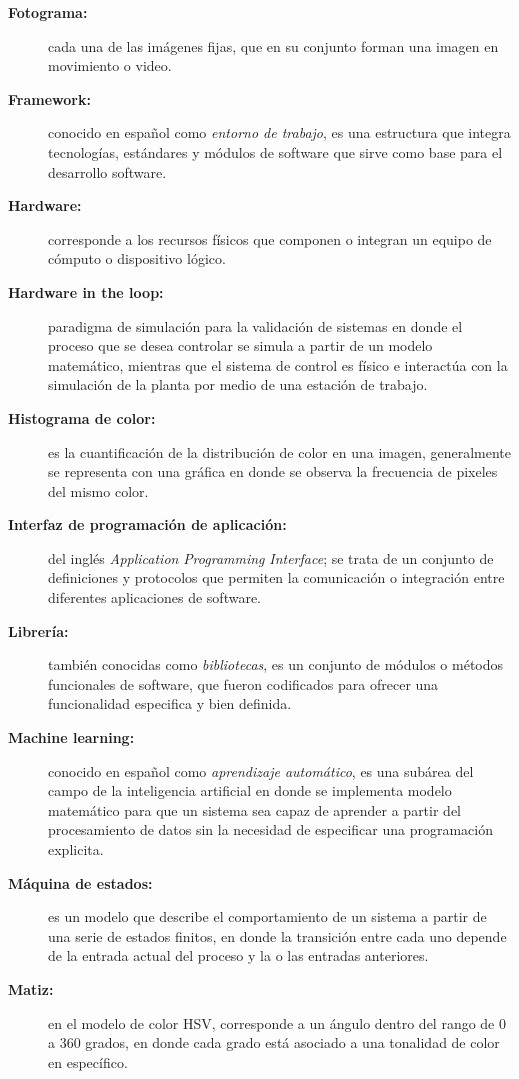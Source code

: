 \begin{description}
  \item[\textbf{Fotograma:}] cada una de las imágenes fijas, que en su conjunto forman una imagen en movimiento o video.
  \item[\textbf{Framework:}] conocido en español como \textit{entorno de trabajo}, es una estructura que integra tecnologías, estándares y módulos de software que sirve como base para el desarrollo software.
  \item[\textbf{Hardware:}] corresponde a los recursos físicos que componen o integran un equipo de cómputo o dispositivo lógico.
  \item[\textbf{Hardware in the loop:}] paradigma de simulación para la validación de sistemas en donde el proceso que se desea controlar se simula a partir de un modelo matemático, mientras que el sistema de control es físico e interactúa con la simulación de la planta por medio de una estación de trabajo.
  \item[\textbf{Histograma de color:}] es la cuantificación de la distribución de color en una imagen, generalmente se representa con una gráfica en donde se observa la frecuencia de pixeles del mismo color.
  \item[\textbf{Interfaz de programación de aplicación:}] del inglés \textit{Application} \textit{Programming} \textit{Interface}; se trata de un conjunto de definiciones y protocolos que permiten la comunicación o integración entre diferentes aplicaciones de software.
  \item[\textbf{Librería:}] también conocidas como \textit{bibliotecas}, es un conjunto de módulos o métodos funcionales de software, que fueron codificados para ofrecer una funcionalidad especifica y bien definida.
  \item[\textbf{Machine learning:}] conocido en español como \textit{aprendizaje automático}, es una subárea del campo de la inteligencia artificial en donde se implementa modelo matemático para que un sistema sea capaz de aprender a partir del procesamiento de datos sin la necesidad de especificar una programación explicita.
  \item[\textbf{Máquina de estados:}] es un modelo que describe el comportamiento de un sistema a partir de una serie de estados finitos, en donde la transición entre cada uno depende de la entrada actual del proceso y la o las entradas anteriores.
  \item[\textbf{Matiz:}] en el modelo de color HSV, corresponde a un ángulo dentro del rango de 0 a 360 grados, en donde cada grado está asociado a una tonalidad de color en específico.

\end{description}
